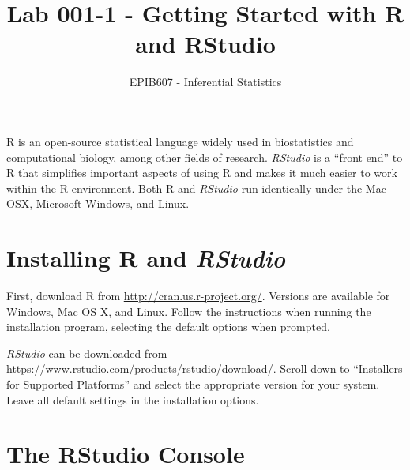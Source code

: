 \documentclass[letterpaper,12pt,twoside,]{pinp}
\title{Lab 001-1 - Getting Started with R and RStudio}
\author[a]{EPIB607 - Inferential Statistics}
\affil[a]{Fall 2020, McGill University}
\begin{document}
\verticaladjustment{-2pt}

\maketitle
\thispagestyle{firststyle}



\tableofcontents

\textsf{R} is an open-source statistical language widely used in
biostatistics and computational biology, among other fields of research.
\textit{RStudio} is a ``front end'' to \textsf{R} that simplifies
important aspects of using \textsf{R} and makes it much easier to work
within the \textsf{R} environment. Both \textsf{R} and \textit{RStudio}
run identically under the Mac OSX, Microsoft Windows, and Linux.

\hypertarget{installing-and}{%
\section{\texorpdfstring{Installing \textsf{R} and
\textit{RStudio}}{Installing  and }}\label{installing-and}}

First, download \textsf{R} from \url{http://cran.us.r-project.org/}.
Versions are available for Windows, Mac OS X, and Linux. Follow the
instructions when running the installation program, selecting the
default options when prompted.

\textit{RStudio} can be downloaded from
\url{https://www.rstudio.com/products/rstudio/download/}. Scroll down to
``Installers for Supported Platforms'' and select the appropriate
version for your system. Leave all default settings in the installation
options.

\hypertarget{the-rstudio-console}{%
\section{The RStudio Console}\label{the-rstudio-console}}
\end{document}
